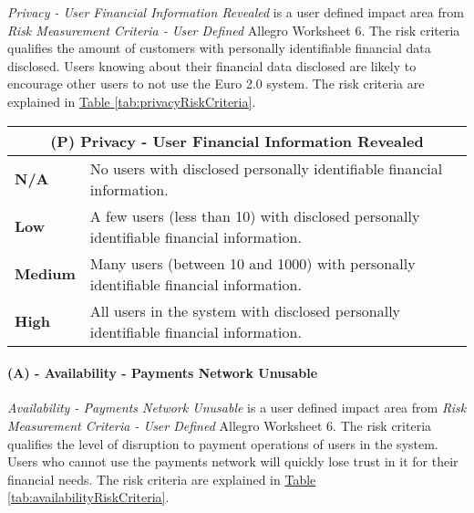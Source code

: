\documentclass[12pt]{article} %
\newcommand{\hypertableref}[1]{\hyperref[#1]{Table \ref{#1}}}
\begin{document}
{\textit{Privacy - User Financial Information Revealed} is a user defined impact area from \textit{Risk Measurement Criteria - User Defined} Allegro Worksheet 6. The risk criteria qualifies the amount of customers with personally identifiable financial data disclosed. Users knowing about their financial data disclosed are likely to encourage other users to not use the Euro 2.0 system. The risk criteria are explained in \hypertableref{tab:privacyRiskCriteria}.

\begin{center}
\begin{tabular}{ | l | p{12cm} | }
  \hline
  \multicolumn{2}{|c|}{\textbf{(P) Privacy - User Financial Information Revealed}}
  \\ \hline
  \textbf{N/A} & No users with disclosed personally identifiable financial information.
  \\ \hline
  \textbf{Low} & A few users (less than 10) with disclosed personally identifiable financial information.
  \\ \hline
  \textbf{Medium} & Many users (between 10 and 1000) with personally identifiable financial information.
  \\ \hline
  \textbf{High} & All users in the system with disclosed personally identifiable financial information.
  \\ \hline
\end{tabular}
\end{center}
\label{tab:privacyRiskCriteria}

\paragraph{(A) - Availability - Payments Network Unusable}

\textit{Availability - Payments Network Unusable} is a user defined impact area from \textit{Risk Measurement Criteria - User Defined} Allegro Worksheet 6. The risk criteria qualifies the level of disruption to payment operations of users in the system. Users who cannot use the payments network will quickly lose trust in it for their financial needs. The risk criteria are explained in \hypertableref{tab:availabilityRiskCriteria}.

}
\end{document}
